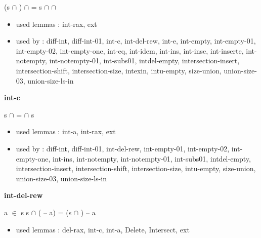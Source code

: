 \documentclass[a4paper]{article}
\begin{document}
\medskip

 \Fol (s $\cap$ ) $\cap$  = s $\cap$  $\cap$ 

\begin{itemize}


\item       used lemmas  : int-rax, ext
\item       used by      : diff-int, diff-int-01, int-c, int-del-rew, int-e, int-empty, int-empty-01, int-empty-02, int-empty-one, int-eq, int-idem, int-ins, int-inse, int-inserte, int-notempty, int-notempty-01, int-subs01, intdel-empty, intersection-insert, intersection-shift, intersection-size, intexin, intu-empty, size-union, union-size-03, union-size-ls-in

\end{itemize}

\medskip

\bigskip

{\large\bf int-c}

\medskip

 \Fol s $\cap$  =  $\cap$ s

\begin{itemize}


\item       used lemmas  : int-a, int-rax, ext
\item       used by      : diff-int, diff-int-01, int-del-rew, int-empty-01, int-empty-02, int-empty-one, int-ins, int-notempty, int-notempty-01, int-subs01, intdel-empty, intersection-insert, intersection-shift, intersection-size, intu-empty, size-union, union-size-03, union-size-ls-in

\end{itemize}

\medskip

\bigskip

{\large\bf int-del-rew}

\medskip

 \Fol \Not a $\in$ s \Imp s $\cap$ ( -- a) = (s $\cap$ ) -- a

\begin{itemize}


\item       used lemmas  : del-rax, int-c, int-a, Delete, Intersect, ext

\end{itemize}

\medskip

\bigskip
\end{document}
